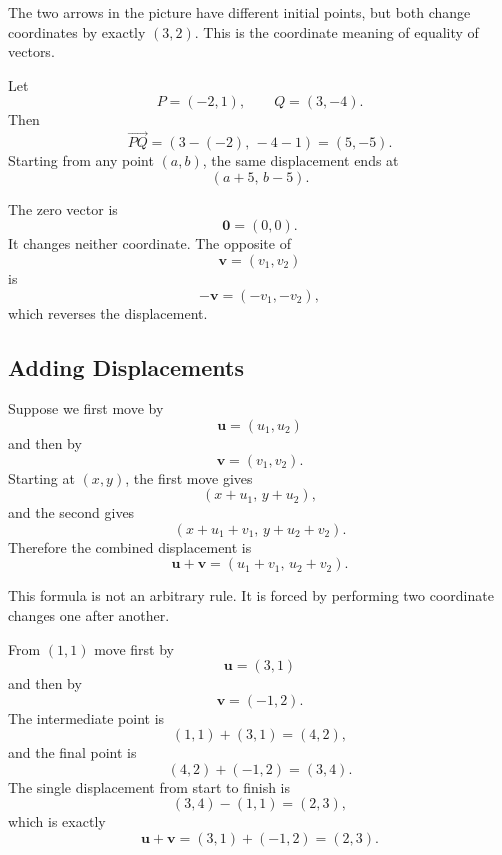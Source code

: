 The two arrows in the picture have different initial points, but both change
coordinates by exactly $(3,2)$.  This is the coordinate meaning of equality of
vectors.

\begin{examplebox}
Let
\[
P=(-2,1),
\qquad
Q=(3,-4).
\]
Then
\[
\overrightarrow{PQ}
=
(3-(-2),\,-4-1)
=
(5,-5).
\]
Starting from any point $(a,b)$, the same displacement ends at
\[
(a+5,\,b-5).
\]
\end{examplebox}

The zero vector is
\[
\mathbf 0=(0,0).
\]
It changes neither coordinate.  The opposite of
\[
\mathbf v=(v_1,v_2)
\]
is
\[
-\mathbf v=(-v_1,-v_2),
\]
which reverses the displacement.

\subsection{Adding Displacements}

Suppose we first move by
\[
\mathbf u=(u_1,u_2)
\]
and then by
\[
\mathbf v=(v_1,v_2).
\]
Starting at $(x,y)$, the first move gives
\[
(x+u_1,\,y+u_2),
\]
and the second gives
\[
(x+u_1+v_1,\,y+u_2+v_2).
\]
Therefore the combined displacement is
\[
\mathbf u+\mathbf v
=
(u_1+v_1,\,u_2+v_2).
\]

This formula is not an arbitrary rule.  It is forced by performing two
coordinate changes one after another.

\begin{examplebox}
From $(1,1)$ move first by
\[
\mathbf u=(3,1)
\]
and then by
\[
\mathbf v=(-1,2).
\]
The intermediate point is
\[
(1,1)+(3,1)=(4,2),
\]
and the final point is
\[
(4,2)+(-1,2)=(3,4).
\]
The single displacement from start to finish is
\[
(3,4)-(1,1)=(2,3),
\]
which is exactly
\[
\mathbf u+\mathbf v=(3,1)+(-1,2)=(2,3).
\]
\end{examplebox}

\begin{center}
\end{center}

